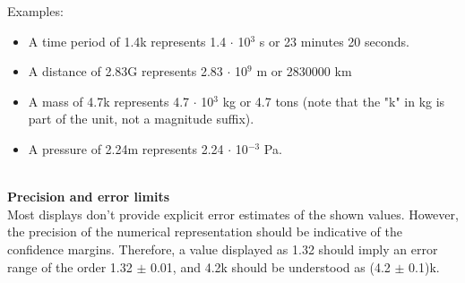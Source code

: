 \documentclass[Orbiter User Manual.tex]{subfiles}
\begin{document}
\noindent
Examples:

\begin{itemize}
\item A time period of 1.4k represents 1.4 $\cdot$ 10$^{3}$ s or 23 minutes 20 seconds.
\item A distance of 2.83G represents 2.83 $\cdot$ 10$^{9}$ m or 2830000 km
\item A mass of 4.7k represents 4.7 $\cdot$ 10$^{3}$ kg or 4.7 tons (note that the "k" in kg is part of the unit, not a magnitude suffix).
\item A pressure of 2.24m represents 2.24 $\cdot$ 10$^{-3}$ Pa.
\end{itemize}

\noindent
\\
\textbf{Precision and error limits}\\
Most displays don’t provide explicit error estimates of the shown values. However, the precision of the numerical representation should be indicative of the confidence margins. Therefore, a value displayed as 1.32 should imply an error range of the order 1.32 $\pm$ 0.01, and 4.2k should be understood as (4.2 $\pm$ 0.1)k.
\end{document}
